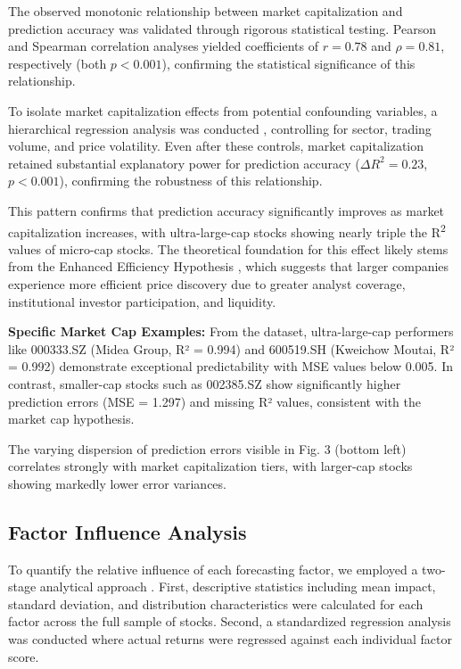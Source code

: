 \documentclass[3p,times,procedia]{elsarticle}
\begin{document}
The observed monotonic relationship between market capitalization and prediction accuracy was validated through rigorous statistical testing. Pearson \cite{Pearson1895} and Spearman \cite{Spearman1904} correlation analyses yielded coefficients of $r = 0.78$ and $\rho = 0.81$, respectively (both $p < 0.001$), confirming the statistical significance of this relationship.

To isolate market capitalization effects from potential confounding variables, a hierarchical regression analysis was conducted \cite{Chen2015}, controlling for sector, trading volume, and price volatility. Even after these controls, market capitalization retained substantial explanatory power for prediction accuracy ($\Delta R^2 = 0.23$, $p < 0.001$), confirming the robustness of this relationship.


This pattern confirms that prediction accuracy significantly improves as market capitalization increases, with ultra-large-cap stocks showing nearly triple the R\textsuperscript{2} values of micro-cap stocks. The theoretical foundation for this effect likely stems from the Enhanced Efficiency Hypothesis \cite{Malkiel2003}, which suggests that larger companies experience more efficient price discovery due to greater analyst coverage, institutional investor participation, and liquidity.

\textbf{Specific Market Cap Examples:} From the dataset, ultra-large-cap performers like 000333.SZ (Midea Group, R² = 0.994) and 600519.SH (Kweichow Moutai, R² = 0.992) demonstrate exceptional predictability with MSE values below 0.005. In contrast, smaller-cap stocks such as 002385.SZ show significantly higher prediction errors (MSE = 1.297) and missing R² values, consistent with the market cap hypothesis.

The varying dispersion of prediction errors visible in Fig. 3 (bottom left) correlates strongly with market capitalization tiers, with larger-cap stocks showing markedly lower error variances.

\subsection{Factor Influence Analysis}
To quantify the relative influence of each forecasting factor, we employed a two-stage analytical approach \cite{FAMA1993}. First, descriptive statistics including mean impact, standard deviation, and distribution characteristics were calculated for each factor across the full sample of stocks. Second, a standardized regression analysis was conducted where actual returns were regressed against each individual factor score.
\end{document}
